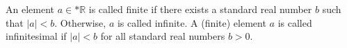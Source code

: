 An element $a \in *\mathbb{R}$ is called finite if there exists a standard real number $b$ such that $|a| < b$. Otherwise, $a$ is called infinite. A (finite) element $a$ is called infinitesimal if $|a| < b$ for all standard real numbers $b > 0$.
